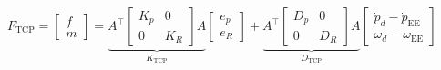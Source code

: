 \documentclass[border=3pt]{standalone}
\begin{document}
{\fontsize{22}{27}\selectfont \color{black}$\displaystyle
F_{\mathrm{TCP}}=\begin{bmatrix}f\\m\end{bmatrix}
=\underbrace{A^\top\begin{bmatrix}K_p&\mathrm{0}\\\mathrm{0}&K_R\end{bmatrix}A}_{K_{\mathrm{TCP}}}
\begin{bmatrix}e_p\\e_R\end{bmatrix}
+\underbrace{A^\top\begin{bmatrix}D_p&\mathrm{0}\\\mathrm{0}&D_R\end{bmatrix}A}_{D_{\mathrm{TCP}}}
\begin{bmatrix}\dot p_d-\dot p_{\mathrm{EE}}\\\omega_d-\omega_{\mathrm{EE}}\end{bmatrix}$}
\end{document}
